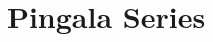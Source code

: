 \documentclass[journal,12pt,twocolumn]{IEEEtran}
\begin{document}
	\let\StandardTheFigure\thefigure
	\renewcommand{\thefigure}{\theproblem}
	
	
	
	\def\putbox#1#2#3{\makebox[0in][l]{\makebox[#1][l]{}\raisebox{\baselineskip}[0in][0in]{\raisebox{#2}[0in][0in]{#3}}}}
	\def\rightbox#1{\makebox[0in][r]{#1}}
	\def\centbox#1{\makebox[0in]{#1}}
	\def\topbox#1{\raisebox{-\baselineskip}[0in][0in]{#1}}
	\def\midbox#1{\raisebox{-0.5\baselineskip}[0in][0in]{#1}}
	
	\vspace{3cm}
	
	\title{ 
		Pingala Series
	}
	
\end{document}
